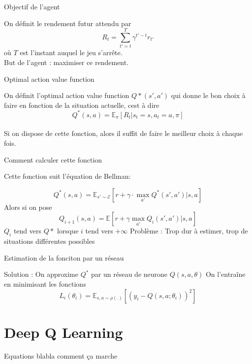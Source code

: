 \documentclass{beamer}
\begin{document}
	\begin{frame}{Objectif de l'agent}
		
		On définit le rendement futur attendu par
		$$R_t = \sum_{t' = t}^{T}\gamma^{t' - t}r_{t'}$$
		où $T$ est l'instant auquel le jeu s'arrête. \\
		But de l'agent : maximiser ce rendement. 
				
	\end{frame}
	
	\begin{frame}{Optimal action value function}
		
		On définit l'optimal action value function $Q*(s', a')$ qui donne le bon choix à faire en fonction de la situation actuelle, cest à dire
		$$Q^*(s, a)=  \mathbb{E}_{\pi}[R_t | s_t = s, a_t = a, \pi]$$\\
		Si on dispose de cette fonction, alors il suffit de faire le meilleur choix à chaque fois.
	\end{frame}
	
	\begin{frame}{Comment calculer cette fonction}
		
		Cette fonction suit l'équation de Bellman:	
		
		$$Q^*(s, a) = \mathbb{E}_{s' \sim \mathcal{E}}[r + \gamma \cdot \max_{a'}Q^*(s', a') | s, a]$$
		Alors si on pose
		$$Q_{i + 1}(s, a) = \mathbb{E}[r + \gamma \max_{a'}Q_i(s', a') | s, a]$$
		$Q_i$ tend vers $Q*$ lorsque $i$ tend vers $+\infty$
		Problème : Trop dur à estimer, trop de situations différentes possibles
	\end{frame}
	
	\begin{frame}{Estimation de la fonciton par un réseau}
		
		Solution : On approxime $Q^*$ par un réseau de neurone $Q(s, a, \theta)$
		On l'entraîne en minimisant les fonctions
		$$L_i(\theta_i) = \mathbb{E}_{s, a \sim \rho(.)}[(y_i - Q(s, a; \theta_i))^2]$$
		
	\end{frame}
	
	\section{Deep Q Learning}
	
	\begin{frame}{Equations blabla comment ça marche}
		
	\end{frame}
	
\end{document}

